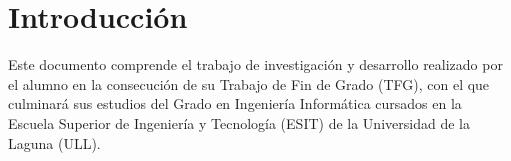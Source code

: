 %
%

\chapter*{Introducción}
Este documento comprende el trabajo de investigación y desarrollo realizado por el alumno en la consecución de su Trabajo de Fin de Grado (TFG), con el que culminará sus estudios del Grado en Ingeniería Informática cursados en la Escuela Superior de Ingeniería y Tecnología (ESIT) de la Universidad de la Laguna (ULL).

